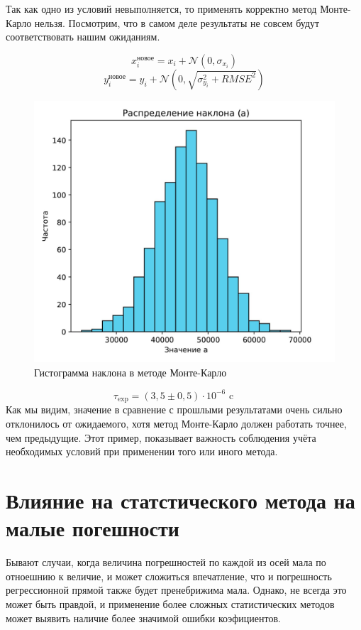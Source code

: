 \documentclass[a4paper,20pt]{article}
\theoremstyle{definition}
\begin{document}
Так как одно из условий невыполняется, то применять корректно метод Монте-Карло нельзя. Посмотрим, что в самом деле результаты не совсем будут соответствовать нашим ожиданиям.

 \begin{equation}
	x_i^{\text{новое}} = x_i + \mathcal{N}(0, \sigma_{x_i}) 
 \end{equation}
 \begin{equation}
	y_i^{\text{новое}} = y_i + \mathcal{N}(0, \sqrt{\sigma_{y_i}^2 + RMSE^2}) 
 \end{equation}
 \begin{figure}[h!]
    \centering
    \includegraphics[width=0.7\linewidth]{gist_second.jpg}
    \caption{Гистограмма наклона в методе Монте-Карло}    
\end{figure}
\begin{equation}
	\tau_{\text{exp}} = (3,5 \pm 0,5 )\cdot10^{-6} \text{     c} \;\;\;\;\;\;\;\; 
\end{equation}
Как мы видим, значение в сравнение с прошлыми результатами очень сильно отклонилось от ожидаемого, хотя метод Монте-Карло должен работать точнее, чем предыдущие.
Этот пример, показывает важность соблюдения учёта необходимых условий при применении того или иного метода.

\newpage
\section{Влияние на статстического метода на малые погешности}
Бывают случаи, когда величина погрешностей по каждой из осей мала по отноешнию к величие, и может сложиться впечатление,
что и погрешность регрессионной прямой также будет пренебрижима мала. Однако, не всегда это может быть правдой, и применение более сложных статистических методов может выявить наличие более значимой ошибки коэфициентов.
\end{document}
